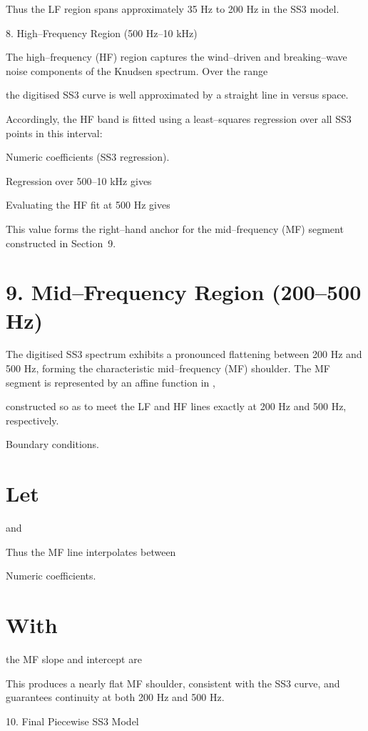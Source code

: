 \documentclass[12pt]{article}
\begin{document}
Thus the LF region spans approximately 35 Hz to 200 Hz in the SS3 model.

8. High–Frequency Region (500 Hz–10 kHz)

The high–frequency (HF) region captures the wind–driven and breaking–wave noise components of the Knudsen spectrum. Over the range


the digitised SS3 curve is well approximated by a straight line in  versus  space.

Accordingly, the HF band is fitted using a least–squares regression over all SS3 points in this interval:


Numeric coefficients (SS3 regression).

Regression over 500–10 kHz gives


Evaluating the HF fit at 500 Hz gives


This value forms the right–hand anchor for the mid–frequency (MF) segment constructed in Section 9.

\section*{9. Mid–Frequency Region (200–500 Hz)}
The digitised SS3 spectrum exhibits a pronounced flattening between 200 Hz and 500 Hz, forming the characteristic mid–frequency (MF) shoulder. The MF segment is represented by an affine function in ,


constructed so as to meet the LF and HF lines exactly at 200 Hz and 500 Hz, respectively.

Boundary conditions.

\section*{Let}

and


Thus the MF line interpolates between


Numeric coefficients.

\section*{With}

the MF slope and intercept are



This produces a nearly flat MF shoulder, consistent with the SS3 curve, and guarantees continuity at both 200 Hz and 500 Hz.

10. Final Piecewise SS3 Model
\end{document}
